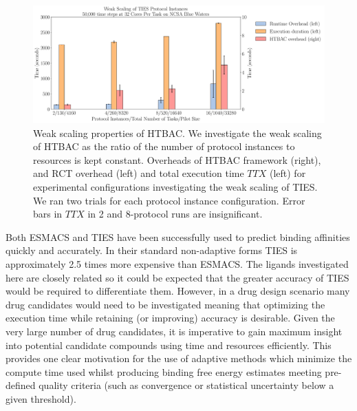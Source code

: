 \documentclass[conference]{IEEEtran}
\begin{document}
\begin{figure}
  \centering
   \includegraphics[width=\columnwidth]
   {weak_scaling_TIES_instances_50,000_timesteps_with_16_instances.pdf}
  \caption{Weak scaling properties of HTBAC. We investigate the
  weak scaling of HTBAC as the ratio of the number of protocol instances to
  resources is kept constant. Overheads of HTBAC framework (right), and RCT overhead 
  (left) and total execution time \(TTX\) (left) for experimental configurations investigating the 
  weak scaling of TIES. We ran two trials for each protocol instance 
  configuration. Error bars in \(TTX\) in 2 and 8-protocol runs are 
  insignificant.}
\label{fig:weak_scaling}
 \vspace{-1.5em}
\end{figure}

Both ESMACS and TIES have been successfully used to predict binding affinities
quickly and accurately. 
In their standard non-adaptive forms TIES is approximately 2.5 times more expensive
than ESMACS.
The ligands investigated here are closely related so it could be expected that the
greater accuracy of TIES would be required to differentiate them.
However, in a drug design scenario many drug candidates would need to be investigated
meaning that optimizing the execution time while retaining (or improving) accuracy is
desirable. 
Given the very large number of drug candidates, it is imperative to
gain maximum insight into potential candidate compounds using time and
resources efficiently. 
This provides one clear motivation for the use of
adaptive methods which minimize the compute time used whilst producing binding
free energy estimates meeting pre-defined quality criteria (such as
convergence or statistical uncertainty below a given threshold).
\end{document}
